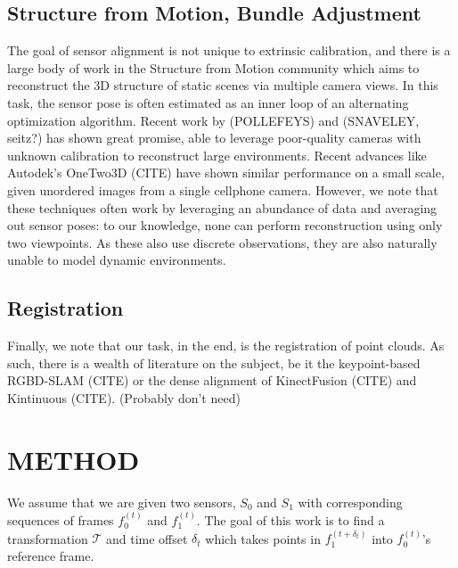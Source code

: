 \documentclass[letterpaper, 10 pt, conference]{ieeeconf}  %
\begin{document}
\subsection{Structure from Motion, Bundle Adjustment}

The goal of sensor alignment is not unique to extrinsic calibration, and there is a large body of work in the 
Structure from Motion community which aims to reconstruct the 3D structure of static scenes via multiple camera 
views. In this task, the sensor pose is often estimated as an inner loop of an alternating optimization algorithm. 
Recent work by (POLLEFEYS) and (SNAVELEY, seitz?) has shown great promise, able to leverage poor-quality cameras with 
unknown calibration to reconstruct large environments. Recent advances like Autodek's OneTwo3D (CITE) have shown 
similar performance on a small scale, given unordered images from a single cellphone camera. However, we note 
that these techniques often work by leveraging an abundance of data and averaging out sensor poses: to our knowledge, 
none can perform reconstruction using only two viewpoints. As these also use discrete observations, they are also 
naturally unable to model dynamic environments.

\subsection{Registration}
Finally, we note that our task, in the end, is the registration of point clouds. As such, there is a wealth of 
literature on the subject, be it the keypoint-based RGBD-SLAM (CITE) or the dense alignment of KinectFusion (CITE) 
and Kintinuous (CITE). (Probably don't need)






\section{METHOD}

We assume that we are given two sensors, $S_0$ and $S_1$ with corresponding sequences of frames $f_0^{(t)}$ and $f_1^{(t)}$. The goal of this work is to find a transformation $\mathcal{T}$ and time offset $\delta_t$ which takes points in $f_1^{(t+\delta_t)}$ into $f_0^{(t)}$'s reference frame.
\end{document}
